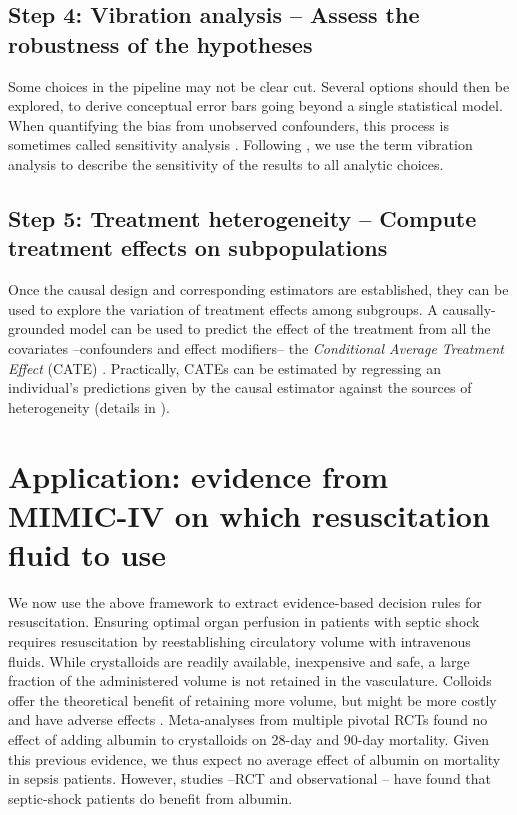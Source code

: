\documentclass[10pt,letterpaper]{article}
\providecommand{\DIFaddtex}[1]{{\protect\color{blue}\uwave{#1}}} %
\providecommand{\DIFaddbegin}{} %
\providecommand{\DIFaddend}{} %
\providecommand{\DIFdelbegin}{} %
\providecommand{\DIFdelend}{} %
\providecommand{\DIFadd}[1]{\texorpdfstring{\DIFaddtex{#1}}{#1}} %
\newcommand{\DIFscaledelfig}{0.5}
\newlength{\DIFdelgraphicswidth} %
\newlength{\DIFdelgraphicsheight} %
\newcommand{\DIFaddincludegraphics}[2][]{{\color{blue}\fbox{\DIFOincludegraphics[#1]{#2}}}} %
\newcommand{\DIFdelincludegraphics}[2][]{%
\sbox{\DIFdelgraphicsbox}{\DIFOincludegraphics[#1]{#2}}%
\settoboxwidth{\DIFdelgraphicswidth}{\DIFdelgraphicsbox} %
\settoboxtotalheight{\DIFdelgraphicsheight}{\DIFdelgraphicsbox} %
\scalebox{\DIFscaledelfig}{%
\parbox[b]{\DIFdelgraphicswidth}{\usebox{\DIFdelgraphicsbox}\\[-\baselineskip] \rule{\DIFdelgraphicswidth}{0em}}\llap{\resizebox{\DIFdelgraphicswidth}{\DIFdelgraphicsheight}{%
\setlength{\unitlength}{\DIFdelgraphicswidth}%
\begin{picture}(1,1)%
\thicklines\linethickness{2pt} %
{\color[rgb]{1,0,0}\put(0,0){\framebox(1,1){}}}%
{\color[rgb]{1,0,0}\put(0,0){\line( 1,1){1}}}%
{\color[rgb]{1,0,0}\put(0,1){\line(1,-1){1}}}%
\end{picture}%
}\hspace*{3pt}}} %
} %
\DeclareRobustCommand{\DIFaddbegin}{\DIFOaddbegin \let\includegraphics\DIFaddincludegraphics} %
\DeclareRobustCommand{\DIFaddend}{\DIFOaddend \let\includegraphics\DIFOincludegraphics} %
\DeclareRobustCommand{\DIFdelbegin}{\DIFOdelbegin \let\includegraphics\DIFdelincludegraphics} %
\DeclareRobustCommand{\DIFdelend}{\DIFOaddend \let\includegraphics\DIFOincludegraphics} %
\begin{document}
\subsection*{Step 4: Vibration analysis -- Assess the robustness of the hypotheses}\label{sec:vibration_analysis}

Some choices in the pipeline may not be clear cut. Several options should then
be explored, to derive conceptual error bars going beyond a single statistical
model. When quantifying the bias from unobserved confounders, this process is
sometimes called sensitivity analysis \cite{schneeweiss2006sensitivity,thabane2013tutorial,fda_statistical_2021}.
Following \cite{patel2015assessment}, we use the term vibration analysis to
describe the sensitivity of the results to all analytic choices.

\subsection*{Step 5: Treatment heterogeneity -- Compute treatment effects on subpopulations}\label{sec:treatment_heterogeneity}

Once the causal design and corresponding estimators are established, they can be
used to explore the variation of treatment effects among subgroups. A
causally-grounded model can be used to predict the effect of the treatment from
all the covariates --confounders and effect modifiers-- the \emph{Conditional Average
  Treatment Effect} (CATE) \cite{robertson2021assessing}. Practically, CATEs can be estimated by regressing
an individual's predictions given by the causal estimator against the sources of
heterogeneity (details in \DIFdelbegin %
\DIFdelend \DIFaddbegin \DIFadd{S7 Appendix}\DIFaddend ).


\section*{Application: evidence from MIMIC-IV on which resuscitation fluid to use}%
\label{sec:application_on_mimic_iv}

We now use the above framework to extract evidence-based decision rules for
resuscitation. Ensuring optimal organ perfusion in patients with septic shock
requires resuscitation by reestablishing circulatory volume with intravenous
fluids. While crystalloids are readily available, inexpensive and safe, a
large fraction of the administered volume is not retained in the vasculature.
Colloids offer the theoretical benefit of retaining more volume, but might be
more costly and have adverse effects \cite{annane2013effects}. Meta-analyses
from multiple pivotal RCTs found no effect of adding albumin to crystalloids
\cite{xu2014comparison,li2020resuscitation} on 28-day and 90-day mortality.  Given this
previous evidence, we thus expect no average effect of albumin on mortality in
sepsis patients. However, studies --RCT \cite{caironi2014albumin}  and observational
\cite{zhou2021early}-- have
found that septic-shock patients do benefit from albumin.
\end{document}
